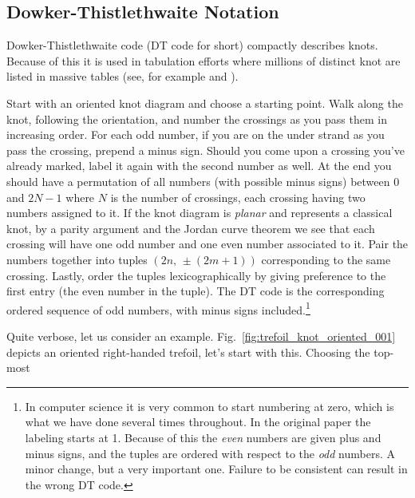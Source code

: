    \subsection{Dowker-Thistlethwaite Notation}
        Dowker-Thistlethwaite code (DT code for short) compactly describes
        knots. Because of this it is used in tabulation efforts where millions
        of distinct knot are listed in massive tables
        (see, for example \cite{Burton2020TheN3} and \cite{regina}).
        \par\hfill\par
        Start with an oriented knot diagram and choose a starting point.
        Walk along the knot, following the orientation, and number the
        crossings as you pass them in increasing order. For each odd number,
        if you are on the under strand as you pass the crossing,
        prepend a minus sign. Should you come upon a crossing you've already
        marked, label it again with the second number as well.
        At the end you should have a permutation of all numbers (with possible
        minus signs) between $0$ and $2N-1$ where $N$ is the number of
        crossings, each crossing having two numbers assigned to it. If the knot
        diagram is \textit{planar} and represents a classical knot, by a
        parity argument and the Jordan curve theorem we see that each crossing
        will have one odd number and one even number associated to it. Pair
        the numbers together into tuples $(2n,\,\pm(2m+1))$ corresponding to the
        same crossing. Lastly, order the tuples lexicographically by giving
        preference to the first entry (the even number in the tuple).
        The DT code is the corresponding ordered sequence of odd numbers,
        with minus signs included.\footnote{%
            In computer science it is very common to start numbering at zero,
            which is what we have done several times throughout. In the
            original paper the labeling starts at 1. Because of this the
            \textit{even} numbers are given plus and minus signs, and the
            tuples are ordered with respect to the \textit{odd} numbers. A
            minor change, but a very important one. Failure to be consistent
            can result in the wrong DT code.
        }
        \par\hfill\par
        Quite verbose, let us consider an example.
        Fig.~\ref{fig:trefoil_knot_oriented_001} depicts an oriented
        right-handed trefoil, let's start with this. Choosing the top-most
